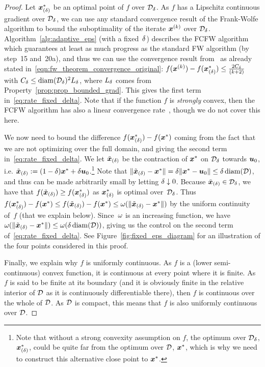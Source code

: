 \begin{proof}
Let $\bm{x}^{*}_{(\delta)}$ be an optimal point of $f$ over $\mathcal{D}_{\delta}$. As $f$ has a Lipschitz continuous gradient over $\mathcal{D}_{\delta}$, we can use any standard convergence result of the Frank-Wolfe algorithm to bound the suboptimality of the iterate $\bm{x}^{(k)}$ over $\mathcal{D}_{\delta}$. Algorithm~\ref{alg:adaptive_eps} (with a fixed~$\delta$) describes the FCFW algorithm which guarantees at least as much progress as the standard FW algorithm (by step~15 and~20a), and thus we can use the convergence result from~\citet{jaggi2013revisiting} as
already stated in~\eqref{eqn:fw_theorem_convergence_original}: $f(\bm{x}^{(k)})-f(\bm{x}^{*}_{(\delta)}) \leq \frac{2C_{\delta}}{(k+2)}$ with $C_{\delta} \leq \operatorname{diam}(\mathcal{D}_{\delta})^2 L_{\delta}$, where $L_{\delta}$ comes from Property~\ref{prop:prop_bounded_grad}. This gives the first term in~\eqref{eq:rate_fixed_delta}. Note that if the function $f$ is \emph{strongly} convex, then the FCFW algorithm has also a linear convergence rate~\citep{lacoste2015MFW}, though we do not cover this here.

We now need to bound the difference $f(\bm{x}^{*}_{(\delta)}) - f(\bm{x}^{*})$ coming from the fact that we are not optimizing
over the full domain, and giving the second term in~\eqref{eq:rate_fixed_delta}. We let $\tilde{\bm{x}}_{(\delta)}$ be the contraction of $\bm{x}^{*}$ on $\mathcal{D}_{\delta}$ towards $\bm{u}_0$, i.e.
$\tilde{\bm{x}}_{(\delta)} := (1-\delta) \bm{x}^{*} + \delta \bm{u}_0$.\footnote{Note that without a strong convexity assumption on $f$, the optimum over $\mathcal{D}_{\delta}$, $\bm{x}^{*}_{(\delta)}$, could be quite far from the optimum over $\mathcal{D}$, $\bm{x}^{*}$, which is why we need to construct this alternative close point to $\bm{x}^{*}$.} Note that $\| \tilde{\bm{x}}_{(\delta)} - \bm{x}^{*} \| = \delta \| \bm{x}^{*} - \bm{u}_0 \| \leq  \delta \operatorname{diam}(\mathcal{D})$, and thus can be made arbitrarily small by letting $\delta \downarrow 0$. Because $\tilde{\bm{x}}_{(\delta)} \in \mathcal{D}_{\delta}$, we have that $f(\tilde{\bm{x}}_{(\delta)}) \geq f(\bm{x}^{*}_{(\delta)})$ as $\bm{x}^{*}_{(\delta)}$ is optimal over~$\mathcal{D}_{\delta}$.
Thus $f(\bm{x}^{*}_{(\delta)}) - f(\bm{x}^{*}) \leq f(\tilde{\bm{x}}_{(\delta)}) - f(\bm{x}^{*}) \leq \omega(\| \tilde{\bm{x}}_{(\delta)} - \bm{x}^{*}\|)$ by the uniform continuity of~$f$ (that we explain below). Since~$\omega$ is an increasing function, we have $\omega(\| \tilde{\bm{x}}_{(\delta)} - \bm{x}^{*}\|) \leq \omega(\delta \operatorname{diam}(\mathcal{D}))$, giving us the control on the second term of~\eqref{eq:rate_fixed_delta}. See Figure~\ref{fig:fixed_eps_diagram} for an illustration of the four points considered in this proof.

Finally, we explain why $f$ is uniformly continuous. As $f$ is a (lower semi-continuous) convex function, it is continuous at every point where it is finite. As $f$ is said to be finite at its boundary (and it is obviously finite in the relative interior of $\mathcal{D}$ as it is continuously differentiable there), then $f$ is continuous over the whole of $\mathcal{D}$. As $\mathcal{D}$ is compact, this means that $f$ is also uniformly continuous over $\mathcal{D}$.
\end{proof}

